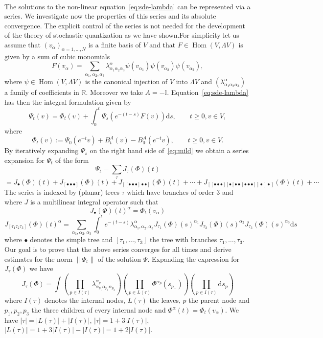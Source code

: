 \documentclass{article}
\newcommand{\assign}{:=}
\newcommand{\mathd}{\mathrm{d}}
\newcommand{\tmop}[1]{\ensuremath{\operatorname{#1}}}
\begin{document}
\

The solutions to the non-linear equation~{\eqref{eq:sde-lambda}} can be
represented via a series. We investigate now the properties of this series and
its absolute convergence. The explicit control of the series is not needed for
the development of the theory of stochastic quantization as we have
shown.\quad For simplicity let us assume that $(v_{\alpha})_{\alpha = 1,
\ldots, N}$ is a finite basis of $V$ and that $F \in \tmop{Hom} (V, \Lambda
V)$ is given by a sum of cubic monomials
\[ F (v_{\alpha}) = \sum_{\alpha_1, \alpha_2, \alpha_3}
   \lambda^{\alpha}_{\alpha_1 \alpha_2 \alpha_3} \psi (v_{\alpha_1}) \psi
   (v_{\alpha_2}) \psi (v_{\alpha_2}), \]
where $\psi \in \tmop{Hom} (V, \Lambda V)$ is the canonical injection of $V$
into $\Lambda V$ and $(\lambda^{\alpha}_{\alpha_1 \alpha_2 \alpha_3})$ a
family of coefficients in $\mathbb{R}$. Moreover we take $A = -\mathbb{I}$.
Equation~{\eqref{eq:sde-lambda}} has then the integral formulation given by
\begin{equation}
  \Psi_t (v) = \Phi_t (v) + \int_0^t \Psi_s (e^{- (t - s)} F (v)) \mathd s,
  \qquad t \geqslant 0, v \in V, \label{eq:mild}
\end{equation}
where
\[ \Phi_t (v) \assign \Psi_0 (e^{- t} v) + B^A_t (v) - B^A_0 (e^{- t} v),
   \qquad t \geqslant 0, v \in V. \]
By iteratively expanding $\Psi_s$ on the right hand side of~{\eqref{eq:mild}}
we obtain a series expansion for $\Psi_t$ of the form
\begin{equation}
  \Psi_t = \sum_{\tau} J_{\tau} (\Phi) (t) \label{eq:sums}
\end{equation}
\[ = J_{\bullet} (\Phi) (t) + J_{[\bullet \bullet \bullet]} (\Phi) (t) +
   J_{[[\bullet \bullet \bullet] \bullet \bullet]} (\Phi) (t) + \cdots +
   J_{[[\bullet \bullet \bullet] [\bullet [\bullet \bullet [\bullet \bullet
   \bullet]] \bullet] \bullet]} (\Phi) (t) + \cdots \]
The series is indexed by (planar) trees $\tau$ which have branches of order 3
and where $J$ is a multilinear integral operator such that
\[ J_{\bullet} (\Phi) (t)^{\alpha} = \Phi_t (v_{\alpha}) \]
\[ J_{[\tau_1 \tau_2 \tau_3]} (\Phi) (t)^{\alpha} = \sum_{\alpha_1, \alpha_2,
   \alpha_3} \int_0^t e^{- (t - s)} \lambda^{\alpha}_{\alpha_1, \alpha_2,
   \alpha_3} J_{\tau_1} (\Phi) (s)^{\alpha_1} J_{\tau_2} (\Phi) (s)^{\alpha_2}
   J_{\tau_3} (\Phi) (s)^{\alpha_3} \mathd s \]
where $\bullet$ denotes the simple tree and $[\tau_1, \ldots, \tau_3]$ the
tree with branches $\tau_1, \ldots, \tau_3$. Our goal is to prove that the
above series converges for all times and derive estimates for the norm $\|
\Psi_t \|$ of the solution $\Psi$. Expanding the expression for $J_{\tau}
(\Phi)$ we have
\[ J_{\tau} (\Phi) = \int \left( \prod_{p \in I (\tau)}
   \lambda^{\alpha_p}_{\alpha_{p_1} \alpha_{p_2} \alpha_{p_3}} \right) \left(
   \prod_{p \in L (\tau)} \Phi^{\alpha_p} (s_{p_-}) \right) \left( \prod_{p
   \in I (\tau)} \mathd s_p \right) \]
where $I (\tau)$ denotes the internal nodes, $L (\tau)$ the leaves, $p$ the
parent node and $p_1, p_2, p_3$ the three children of every internal node and
$\Phi^{\alpha} (t) = \Phi_t (v_{\alpha})$. We have $| \tau | = | L (\tau) | +
| I (\tau) |$, $| \tau | = 1 + 3 | I (\tau) |$, $| L (\tau) | = 1 + 3 | I
(\tau) | - | I (\tau) | = 1 + 2 | I (\tau) |$.
\end{document}
